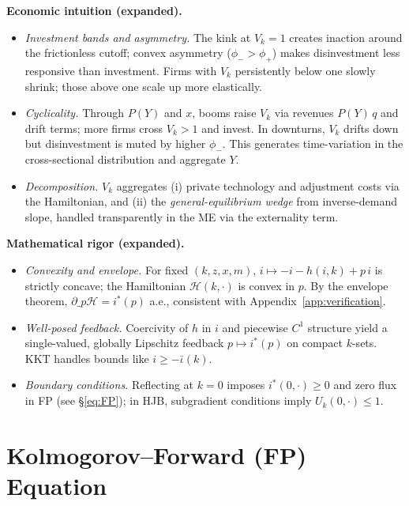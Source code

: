 \documentclass[11pt,letterpaper,oneside]{article}
\numberwithin{equation}{section}
\newcommand{\1}{\mathbf{1}}
\newcommand{\kbar}{\bar\iota}
\begin{document}
\begin{tcolorbox}[didacticstyle]
\textbf{Economic intuition (expanded).}
\begin{itemize}[leftmargin=1.15em,itemsep=0.25em]
  \item \emph{Investment bands and asymmetry.} The kink at $V_k=1$ creates inaction around the frictionless cutoff; convex asymmetry ($\phi_->\phi_+$) makes disinvestment less responsive than investment. Firms with $V_k$ persistently below one slowly shrink; those above one scale up more elastically.
  \item \emph{Cyclicality.} Through $P(Y)$ and $x$, booms raise $V_k$ via revenues $P(Y)\,q$ and drift terms; more firms cross $V_k>1$ and invest. In downturns, $V_k$ drifts down but disinvestment is muted by higher $\phi_-$. This generates time-variation in the cross-sectional distribution and aggregate $Y$.
  \item \emph{Decomposition.} $V_k$ aggregates (i) private technology and adjustment costs via the Hamiltonian, and (ii) the \emph{general-equilibrium wedge} from inverse-demand slope, handled transparently in the ME via the externality term.
\end{itemize}
\end{tcolorbox}

\begin{tcolorbox}[mathstyle]
\textbf{Mathematical rigor (expanded).}
\begin{itemize}[leftmargin=1.15em,itemsep=0.25em]
  \item \emph{Convexity and envelope.} For fixed $(k,z,x,m)$, $i\mapsto -i-h(i,k)+p\,i$ is strictly concave; the Hamiltonian $\mathcal H(k,\cdot)$ is convex in $p$. By the envelope theorem, $\partial\_p\mathcal H=i^*(p)$ a.e., consistent with Appendix~\ref{app:verification}.
  \item \emph{Well-posed feedback.} Coercivity of $h$ in $i$ and piecewise $C^1$ structure yield a single-valued, globally Lipschitz feedback $p\mapsto i^*(p)$ on compact $k$-sets. KKT handles bounds like $i\ge-\kbar(k)$.
  \item \emph{Boundary conditions.} Reflecting at $k=0$ imposes $i^*(0,\cdot)\ge0$ and zero flux in FP (see \S\ref{eq:FP}); in HJB, subgradient conditions imply $U_k(0,\cdot)\le1$.
\end{itemize}
\end{tcolorbox}

\section{Kolmogorov--Forward (FP) Equation}
\end{document}
